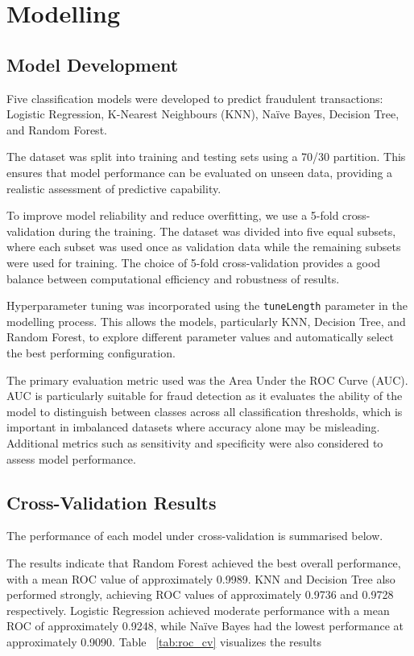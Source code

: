 \documentclass{article}
\begin{document}
\section{Modelling}

\subsection{Model Development}

Five classification models were developed to predict fraudulent transactions: Logistic Regression, K-Nearest Neighbours (KNN), Naïve Bayes, Decision Tree, and Random Forest. 

The dataset was split into training and testing sets using a 70/30 partition. This ensures that model performance can be evaluated on unseen data, providing a realistic assessment of predictive capability.

To improve model reliability and reduce overfitting, we use a 5-fold cross-validation during the training. The dataset was divided into five equal subsets, where each subset was used once as validation data while the remaining subsets were used for training. The choice of 5-fold cross-validation provides a good balance between computational efficiency and robustness of results.

Hyperparameter tuning was incorporated using the \texttt{tuneLength} parameter in the modelling process. This allows the models, particularly KNN, Decision Tree, and Random Forest, to explore different parameter values and automatically select the best performing configuration.

The primary evaluation metric used was the Area Under the ROC Curve (AUC). AUC is particularly suitable for fraud detection as it evaluates the ability of the model to distinguish between classes across all classification thresholds, which is important in imbalanced datasets where accuracy alone may be misleading. Additional metrics such as sensitivity and specificity were also considered to assess model performance.

\subsection{Cross-Validation Results}

The performance of each model under cross-validation is summarised below.

The results indicate that Random Forest achieved the best overall performance, with a mean ROC value of approximately 0.9989. KNN and Decision Tree also performed strongly, achieving ROC values of approximately 0.9736 and 0.9728 respectively. Logistic Regression achieved moderate performance with a mean ROC of approximately 0.9248, while Naïve Bayes had the lowest performance at approximately 0.9090. Table ~\ref{tab:roc_cv} visualizes the results
\end{document}
